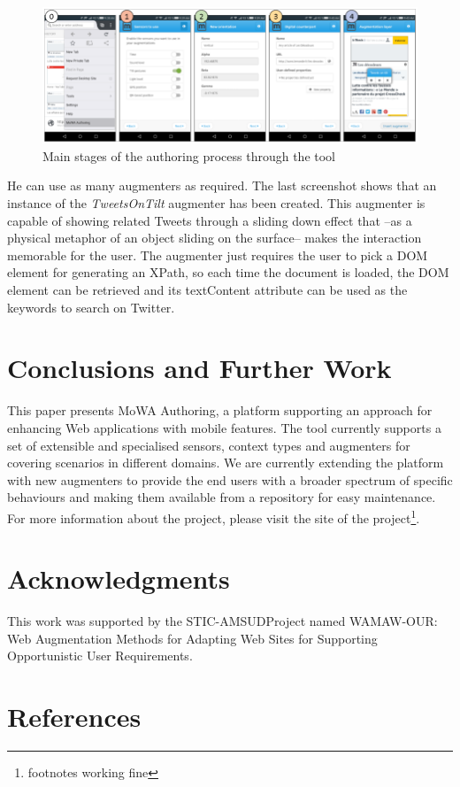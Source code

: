 \documentclass[runningheads]{llncs}
\begin{document}
\begin{figure}
\includegraphics[width=\textwidth]{fig3.png}
\caption{Main stages of the authoring process through the tool} \label{fig3}
\end{figure}

He can use as many augmenters as required. The last screenshot shows that an instance of the \textit{TweetsOnTilt} augmenter has been created. This augmenter is capable of showing related Tweets through a sliding down effect that –as a physical metaphor of an object sliding on the surface– makes the interaction memorable for the user. The augmenter just requires the user to pick a DOM element for generating an XPath, so each time the document is loaded, the DOM element can be retrieved and its textContent attribute can be used as the keywords to search on Twitter. 

\section{Conclusions and Further Work}
This paper presents MoWA Authoring, a platform supporting an approach for enhancing Web applications with mobile features. The tool currently supports a set of extensible and specialised sensors, context types and augmenters for covering scenarios in different domains. We are currently extending the platform with new augmenters to provide the end users with a broader spectrum of specific behaviours and making them available from a repository for easy maintenance. For more information about the project, please visit the site of the project\footnote{footnotes working fine}.

\section{Acknowledgments}
This work was supported by the \guillemotleft STIC-AMSUD\guillemotright\thinspace Project named \guillemotleft WAMAW-OUR: Web Augmentation Methods for Adapting Web Sites for Supporting Opportunistic User Requirements\guillemotright.

\section{References}
%

\renewcommand{\refname}{}

\end{document}
